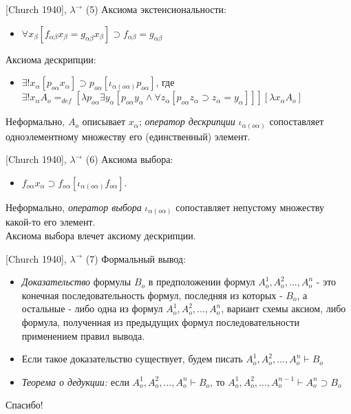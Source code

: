\documentclass{beamer}
\begin{document}
\begin{frame}{[Church 1940], $\lambda^\to$ (5)}
Аксиома экстенсиональности:\\
\bigskip
\begin{itemize}
  \item $\forall x_\beta [f_{\alpha \beta} x_\beta = g_{\alpha \beta} x_\beta] \supset f_{\alpha \beta} = g_{\alpha \beta}$
\end{itemize}
\bigskip
Аксиома дескрипции:\\
\begin{itemize}
  \item $\exists ! x_\alpha [p_{o \alpha} x_\alpha] \supset p_{o \alpha} [\iota_{\alpha(o \alpha)}p_{o \alpha}]$, где $\exists ! x_\alpha A_o =_{def} [\lambda p_{o \alpha} \exists y_\alpha[p_{o \alpha} y_\alpha \wedge \forall z_\alpha[p_{o \alpha} z_\alpha \supset z_\alpha = y_\alpha]]][\lambda x_\alpha A_o]$
\end{itemize}
\bigskip
Неформально, $A_o$ описывает $x_\alpha$; \textit{оператор дескрипции} $\iota_{\alpha (o \alpha)}$ сопоставляет одноэлементному множеству его (единственный) элемент.
\end{frame}

\begin{frame}{[Church 1940], $\lambda^\to$ (6)}
Аксиома выбора:\\
\bigskip
\begin{itemize}
  \item $f_{o \alpha} x_\alpha \supset f_{o \alpha} [\iota_{\alpha (o \alpha)} f_{o \alpha}].$
\end{itemize}
\bigskip
Неформально, \textit{оператор выбора} $\iota_{\alpha (o \alpha)}$ сопоставляет непустому множеству какой-то его элемент.\\
\bigskip
Аксиома выбора влечет аксиому дескрипции.
\end{frame}

\begin{frame}{[Church 1940], $\lambda^\to$ (7)}
Формальный вывод:\\
\bigskip
\begin{itemize}
  \item \textit{Доказательство} формулы $B_o$ в предположении формул $A_o^1, A_o^2, ..., A_o^n$ - это конечная последовательность формул, последняя из которых - $B_o$, а остальные - либо одна из формул $A_o^1, A_o^2, ..., A_o^n$, вариант схемы аксиом, либо формула, полученная из предыдущих формул последовательности применением правил вывода.
  \item Если такое доказательство существует, будем писать $A_o^1, A_o^2, ..., A_o^n \vdash B_o$
  \item \textit{Теорема о дедукции:} если $A_o^1, A_o^2, ..., A_o^n \vdash B_o$, то $A_o^1, A_o^2, ..., A_o^{n-1} \vdash A_o^n \supset B_o$
\end{itemize}
\end{frame}


\begin{frame}{}
    \thispagestyle{empty}
    \begin{center}
        {\large Спасибо!}
    \end{center}
\end{frame}


\end{document}
